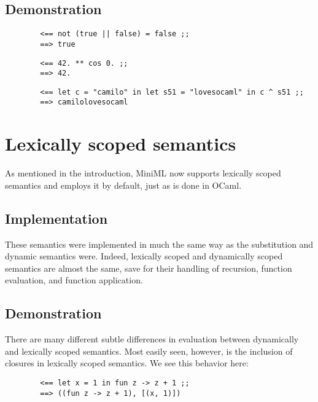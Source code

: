 \documentclass[10pt,letterpaper]{article}
\begin{document}
\subsection*{Demonstration}
\begin{center}
    \begin{verbatim}
        <== not (true || false) = false ;;
        ==> true
    \end{verbatim}  
    \begin{verbatim}
        <== 42. ** cos 0. ;;
        ==> 42.
    \end{verbatim}
\end{center}

\begin{verbatim}
        <== let c = "camilo" in let s51 = "lovesocaml" in c ^ s51 ;;
        ==> camilolovesocaml
    \end{verbatim}


\section*{Lexically scoped semantics}
As mentioned in the introduction, MiniML now supports lexically scoped semantics and employs it by default, just as is done in OCaml.  

\subsection*{Implementation}
These semantics were implemented in much the same way as the substitution and dynamic semantics were. Indeed, lexically scoped and dynamically scoped semantics are almost the same, save for their handling of recursion, function evaluation, and function application.

\pagebreak
\subsection*{Demonstration}
There are many different subtle differences in evaluation between dynamically and lexically scoped semantics. Most easily seen, however, is the inclusion of closures in lexically scoped semantics. We see this behavior here:

\begin{center}
    \begin{verbatim}
        <== let x = 1 in fun z -> z + 1 ;;
        ==> ((fun z -> z + 1), [(x, 1)])
    \end{verbatim}
\end{center}
\end{document}
